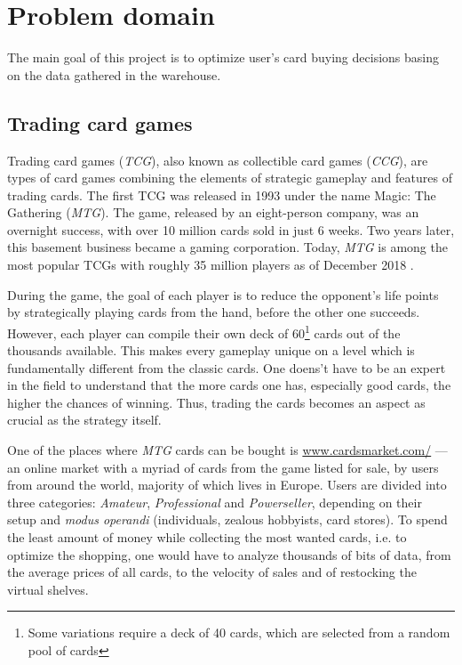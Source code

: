 \section{Problem domain}
The main goal of this project is to optimize user's card buying decisions basing on the data gathered in the warehouse.

\subsection{Trading card games}
Trading card games (\textit{TCG}), also known as collectible card games (\textit{CCG}), are types of card games combining the elements of strategic gameplay and features of trading cards.
The first TCG was released in 1993 under the name Magic: The Gathering (\textit{MTG}). The game, released by an eight-person company, was an overnight success, with over 10 million cards sold in just 6 weeks.
Two years later, this basement business became a gaming corporation. Today, \textit{MTG} is among the most popular TCGs with roughly 35 million players as of December 2018 \cite{magicTheGathering}. \par
During the game, the goal of each player is to reduce the opponent's life points by strategically playing cards from the hand, before the other one succeeds. However, each player can compile their own deck of 60\footnote{Some variations require a deck of 40 cards, which are selected from a random pool of cards} cards out of the thousands available. This makes every gameplay unique on a level which is fundamentally different from the classic cards. One doens't have to be an expert in the field to understand that the more cards one has, especially good cards, the higher the chances of winning. Thus, trading the cards becomes an aspect as crucial as the strategy itself. \par
One of the places where \textit{MTG} cards can be bought is \url{www.cardsmarket.com/} --- an online market with a myriad of cards from the game listed for sale, by users from around the world, majority of which lives in Europe. Users are divided into three categories: \textit{Amateur}, \textit{Professional} and \textit{Powerseller}, depending on their setup and \textit{modus operandi} (individuals, zealous hobbyists, card stores). To spend the least amount of money while collecting the most wanted cards, i.e. to optimize the shopping, one would have to analyze thousands of bits of data, from the average prices of all cards, to the velocity of sales and of restocking the virtual shelves.


